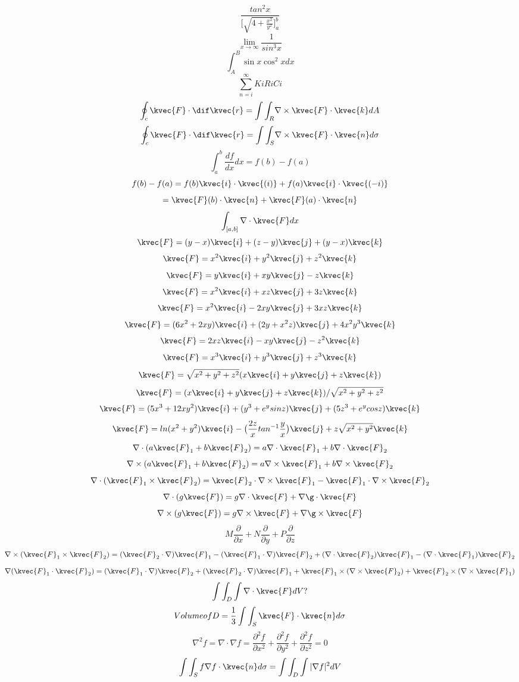 \[	\frac{tan^{2}x}{\big[\sqrt{4+\frac{x^{2}}{y^{2}}}\big ]_{a}^{b}}\]
\[  \lim_{x\to\infty}\frac {1}{sin^{3}x}\]
\[\int_{A}^{B}\sin{x}\cos^{2}{x}dx\]
\[\sum_{n=i}^{\infty}KiRiCi\]
\[\oint_{c}{\kvec{F}}\cdot{\dif\kvec{r}}=\int{\int_{R}}\nabla\times\kvec{F}\cdot\kvec{k}dA\]
\[\oint_{c}{\kvec{F}}\cdot{\dif\kvec{r}}=\int{\int_{S}}\nabla\times\kvec{F}\cdot\kvec{n}d{\sigma}\]
\[\int_{a}^{b}\frac{df}{dx}dx=f(b)-f(a)\]
\[f(b)-f(a)=f(b)\kvec{i}\cdot\kvec{(i)}+f(a)\kvec{i}\cdot\kvec{(-i)}\]
            \[=\kvec{F}(b)\cdot\kvec{n}+\kvec{F}(a)\cdot\kvec{n}\]
\[\int_{[a,b]}\nabla\cdot\kvec{F}dx\]
\[\kvec{F}=(y-x)\kvec{i}+(z-y)\kvec{j}+(y-x)\kvec{k}\]
\[\kvec{F}=x^{2}\kvec{i}+y^{2}\kvec{j}+z^{2}\kvec{k}\]
\[\kvec{F}=y\kvec{i}+xy\kvec{j}-z\kvec{k}\]
\[\kvec{F}=x^{2}\kvec{i}+xz\kvec{j}+3z\kvec{k}\]
\[\kvec{F}=x^{2}\kvec{i}-2xy\kvec{j}+3xz\kvec{k}\]
\[\kvec{F}=(6x^{2}+2xy)\kvec{i}+(2y+x^{2}z)\kvec{j}+4x^{2}y^{3}\kvec{k}\]
\[\kvec{F}=2xz\kvec{i}-xy\kvec{j}-z^{2}\kvec{k}\]
\[\kvec{F}=x^{3}\kvec{i}+y^{3}\kvec{j}+z^{3}\kvec{k}\]
\[\kvec{F}=\sqrt{x^{2}+y^{2}+z^{2}}(x\kvec{i}+y\kvec{j}+z\kvec{k})\]
\[\kvec{F}=(x\kvec{i}+y\kvec{j}+z\kvec{k})/\sqrt{x^{2}+y^{2}+z^{2}}\]
\[\kvec{F}=(5x^{3}+12xy^{2})\kvec{i}+(y^{3}+e^{y}sinz)\kvec{j}+(5z^{3}+e^{y}cosz)\kvec{k}\]
\[\kvec{F}=ln(x^{2}+y^{2})\kvec{i}-\big(\frac{2z}{x}tan^{-1}\frac{y}{x}\big)\kvec{j}+z\sqrt{x^{2}+y^{2}}\kvec{k}\]
\[\nabla\cdot(a\kvec{F}_{1}+b\kvec{F}_{2})=a\nabla\cdot\kvec{F}_{1}+b\nabla\cdot\kvec{F}_{2}\]
\[\nabla\times(a\kvec{F}_{1}+b\kvec{F}_{2})=a\nabla\times\kvec{F}_{1}+b\nabla\times\kvec{F}_{2}\]
\[\nabla\cdot(\kvec{F}_{1}\times\kvec{F}_{2})=\kvec{F}_{2}\cdot\nabla\times\kvec{F}_{1}-\kvec{F}_{1}\cdot\nabla\times\kvec{F}_{2}\]
\[\nabla\cdot(g\kvec{F})=g\nabla\cdot\kvec{F}+\nabla\g\cdot\kvec{F}\]
\[\nabla\times(g\kvec{F})=g\nabla\times\kvec{F}+\nabla\g\times\kvec{F}\]
\[M\frac{\partial}{\partial x}+N\frac{\partial}{\partial y}+P\frac{\partial}{\partial z}\]
\[\nabla\times(\kvec{F}_{1}\times\kvec{F}_{2})=(\kvec{F}_{2}\cdot\nabla)\kvec{F}_{1}-(\kvec{F}_{1}\cdot\nabla)\kvec{F}_{2}+(\nabla\cdot\kvec{F}_{2})\kvec{F}_{1}-(\nabla\cdot\kvec{F}_{1})\kvec{F}_{2}\]
\[\nabla(\kvec{F}_{1}\cdot\kvec{F}_{2})=(\kvec{F}_{1}\cdot\nabla)\kvec{F}_{2}+(\kvec{F}_{2}\cdot\nabla)\kvec{F}_{1}+\kvec{F}_{1}\times(\nabla\times\kvec{F}_{2})+\kvec{F}_{2}\times(\nabla\times\kvec{F}_{1})\]
\[\int\int_{D}\int\nabla\cdot\kvec{F}dV?\]
\[Volume of D=\frac{1}{3}\int\int_{S}\kvec{F}\cdot\kvec{n}d\sigma\]
\[\nabla^{2}f=\nabla\cdot\nabla f=\frac{\partial^{2}f}{\partial x^{2}}+\frac{\partial^{2}f}{\partial y^{2}}+\frac{\partial^{2}f}{\partial z^{2}}=0\]
\[\int\int_{S}f\nabla f\cdot\kvec{n}d\sigma=\int\int_{D}\int|\nabla f|^{2}dV\]
